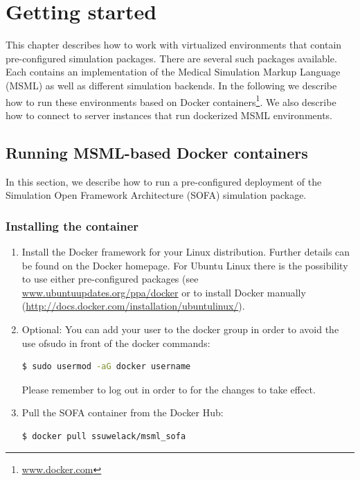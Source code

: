\chapter{Getting started}                %
This chapter describes how to work with virtualized environments that contain pre-configured simulation packages. There are several such packages available. Each contains an implementation of the Medical Simulation Markup Language (MSML) as well as different simulation backends. In the following we describe how to run these environments based on Docker containers\footnote{\url{www.docker.com} }. We also describe how to connect to server instances that run dockerized MSML environments.   
 
\section{Running MSML-based Docker containers}
In this section, we describe how to run a pre-configured deployment of the Simulation Open Framework Architecture (SOFA) simulation package. 

\subsection{Installing the container}                  %

\begin{enumerate}
	\item Install the Docker framework for your Linux distribution. Further details can be found on the Docker homepage. For Ubuntu Linux there is the possibility to use either pre-configured packages (see \url{www.ubuntuupdates.org/ppa/docker} or to install Docker manually (\url{http://docs.docker.com/installation/ubuntulinux/}).
	\item Optional: You can add your user to the docker group in order to avoid the use ofsudo in front of the docker commands:
		\begin{lstlisting}[language=sh]
  $ sudo usermod -aG docker username
\end{lstlisting}
Please remember to log out in order to for the changes to take effect.
	\item Pull the SOFA container from the Docker Hub: 
	\begin{lstlisting}[language=sh]
  $ docker pull ssuwelack/msml_sofa
\end{lstlisting}
\end{enumerate}

